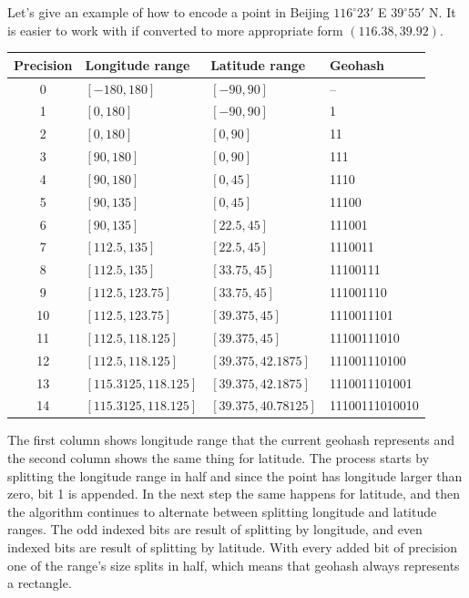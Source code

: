 \documentclass[times, utf8, diplomski]{fer}
\begin{document}
Let's give an example of how to encode a point in Beijing $116^{\circ}23'$ E $39^{\circ}55'$ N. It is easier to work with if converted to more appropriate form $(116.38, 39.92)$. 

\begin{center}
\begin{tabular}{ |c|l|l|l| } 
	\hline
	Precision & Longitude range & Latitude range & Geohash \\
	\hline
	0 & $[-180, 180]$ & $[-90, 90]$ & -- \\ 
	1 & $[0, 180]$ & $[-90, 90]$ & 1 \\ 
	2 & $[0, 180]$ & $[0, 90]$ & 11 \\ 
	3 & $[90, 180]$ & $[0, 90]$ & 111 \\ 
	4 & $[90, 180]$ & $[0, 45]$ & 1110 \\ 
	5 & $[90, 135]$ & $[0, 45]$ & 11100 \\ 
	6 & $[90, 135]$ & $[22.5, 45]$ & 111001 \\ 
	7 & $[112.5, 135]$ & $[22.5, 45]$ & 1110011 \\ 
	8 & $[112.5, 135]$ & $[33.75, 45]$ & 11100111 \\ 
	9 & $[112.5, 123.75]$ & $[33.75, 45]$ & 111001110 \\ 
	10 & $[112.5, 123.75]$ & $[39.375, 45]$ & 1110011101 \\ 
	11 & $[112.5, 118.125]$ & $[39.375, 45]$ & 11100111010 \\ 
	12 & $[112.5, 118.125]$ & $[39.375, 42.1875]$ & 111001110100 \\ 
	13 & $[115.3125, 118.125]$ & $[39.375, 42.1875]$ & 1110011101001 \\ 
	14 & $[115.3125, 118.125]$ & $[39.375, 40.78125]$ & 11100111010010 \\ 
	\hline
\end{tabular}
\end{center}

The first column shows longitude range that the current geohash represents and the second column shows the same thing for latitude. The process starts by splitting the longitude range in half and since the point has longitude larger than zero, bit 1 is appended. In the next step the same happens for latitude, and then the algorithm continues to alternate between splitting longitude and latitude ranges. The odd indexed bits are result of splitting by longitude, and even indexed bits are result of splitting by latitude. With every added bit of precision one of the range's size splits in half, which means that geohash always represents a rectangle.
\end{document}
